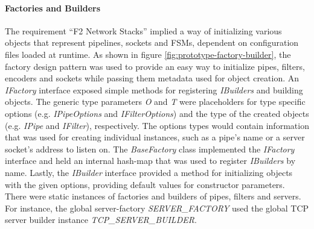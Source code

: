 \paragraph{Factories and Builders}
The requirement \enquote{F2 Network Stacks} implied a way of initializing various objects that represent pipelines, sockets and \acp{FSM}, dependent on configuration files loaded at runtime. As shown in figure \ref{fig:prototype-factory-builder}, the factory design pattern was used to provide an easy way to initialize pipes, filters, encoders and sockets while passing them metadata used for object creation. An \emph{IFactory} interface exposed simple methods for registering \emph{IBuilders} and building objects. The generic type parameters \emph{O} and \emph{T} were placeholders for type specific options (e.g. \emph{IPipeOptions} and \emph{IFilterOptions}) and the type of the created objects (e.g. \emph{IPipe} and \emph{IFilter}), respectively. The options types would contain information that was used for creating individual instances, such as a pipe's name or a server socket's address to listen on. The \emph{BaseFactory} class implemented the \emph{IFactory} interface and held an internal hash-map that was used to register \emph{IBuilders} by name. Lastly, the \emph{IBuilder} interface provided a method for initializing objects with the given options, providing default values for constructor parameters. There were static instances of factories and builders of pipes, filters and servers. For instance, the global server-factory \emph{SERVER\_FACTORY} used the global TCP server builder instance \emph{TCP\_SERVER\_BUILDER}.


